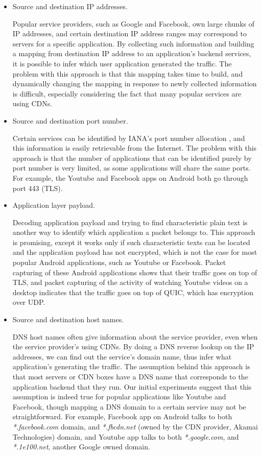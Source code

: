 	\begin{itemize}
		
		\item Source and destination IP addresses. 
		
		Popular service providers, such as Google and Facebook, own large chunks of IP addresses, and certain destination IP address ranges may correspond to servers for a specific application. By collecting such information and building a  mapping from destination IP address to an application's backend services, it is possible to infer which user application generated the traffic. The problem with this approach is that this mapping takes time to build, and dynamically changing the mapping in response to newly collected information is difficult, especially considering the fact that many popular services are using CDNs.
		
		\item Source and destination port number. 
		
		Certain services can be identified by IANA's port number allocation \cite{PortAssignment}, and this information is easily retrievable from the Internet. The problem with this approach is that the number of applications that can be identified purely by port number is very limited, as some applications will share the same ports. For example, the Youtube and Facebook apps on Android both go through port 443 (TLS).
		
		\item Application layer payload. 
		
		Decoding application payload and trying to find characteristic plain text is another way to identify which application a packet belongs to. This approach is promising, except it works only if such characteristic texts can be located and the application payload has not encrypted, which is not the case for most popular Android applications, such as Youtube or Facebook. Packet capturing of these Android applications shows that their traffic goes on top of TLS, and packet capturing of the activity of watching Youtube videos on a desktop indicates that the traffic goes on top of QUIC, which has encryption over UDP.
		
		\item Source and destination host names. 
		
		DNS host names often give information about the service provider, even when the service provider's using CDNs. By doing a DNS reverse lookup on the IP addresses, we can find out the service's domain name, thus infer what application's generating the traffic. The assumption behind this approach is that most servers or CDN boxes have a DNS name that corresponds to the application backend that they run. Our initial experiments suggest that this assumption is indeed true for popular applications like Youtube and Facebook, though mapping a DNS domain to a certain service may not be straightforward. For example, Facebook app on Android talks to both \textit{*.facebook.com} domain, and \textit{*.fbcdn.net} (owned by the CDN provider, Akamai Technologies) domain, and Youtube app talks to both \textit{*.google.com}, and \textit{*.1e100.net}, another Google owned domain. 
		

\end{itemize}
